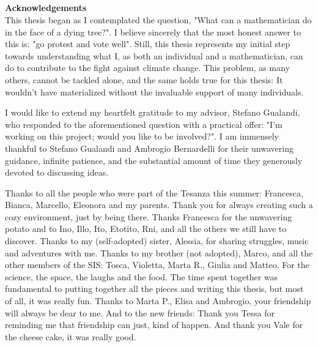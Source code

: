 \documentclass[11pt,a4paper,oneside,openany]{book}
\numberwithin{definition}{section}
\numberwithin{theorem}{section}
\numberwithin{problem}{section}
\begin{document}
\begin{footnotesize}


\printbibliography[
heading=bibintoc,
title={Bibliography}]



\end{footnotesize}
\pagebreak
\vspace*{1.5cm}
\begin{flushright}
\begin{minipage}{.9\textwidth}
\chapter*{}
{\bf \huge Acknowledgements} \vspace{20 pt} \\
This thesis began as I contemplated the question, "What can a mathematician do in the face of a dying tree?". I believe sincerely that the most honest answer to this is: "go protest and vote well". Still, this thesis represents my initial step towards understanding what I, as both an individual and a mathematician, can do to contribute to the fight against climate change. This problem, as many others, cannot be tackled alone, and the same holds true for this thesis: It wouldn't have materialized without the invaluable support of many individuals.

I would like to extend my heartfelt gratitude to my advisor, Stefano Gualandi, who responded to the aforementioned question with a practical offer: "I'm working on this project; would you like to be involved?". I am immensely thankful to Stefano Gualandi and Ambrogio Bernardelli for their unwavering guidance, infinite patience, and the substantial amount of time they generously devoted to discussing ideas.

Thanks to all the people who were part of the Tesanza this summer: Francesca, Bianca, Marcello, Eleonora and my parents. Thank you for always creating such a cozy environment, just by being there. Thanks Francesca for the unwavering potato and to Ino, Illo, Ito, Etotito, Rni, and all the others we still have to discover. Thanks to my (self-adopted) sister, Alessia, for sharing struggles, music and adventures with me. Thanks to my brother (not adopted), Marco, and all the other members of the SIS: Tosca, Violetta, Marta R., Giulia and Matteo. For the science, the space, the laughs and the food. The time spent together was fundamental to putting together all the pieces and writing this thesis, but most of all, it was really fun. Thanks to Marta P., Elisa and Ambrogio, your friendship will always be dear to me. And to the new friends: Thank you Tessa for reminding me that friendship can just, kind of happen.
And thank you Vale for the cheese cake, it was really good.

\begin{footnotesize}


\end{footnotesize}
\end{minipage}

\end{flushright}







\end{document}

